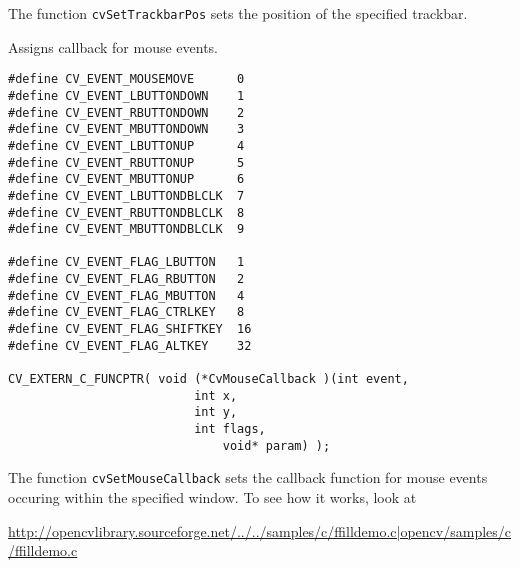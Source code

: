 The function \texttt{cvSetTrackbarPos} sets the position of the specified trackbar.


Assigns callback for mouse events.


\begin{lstlisting}
#define CV_EVENT_MOUSEMOVE      0
#define CV_EVENT_LBUTTONDOWN    1
#define CV_EVENT_RBUTTONDOWN    2
#define CV_EVENT_MBUTTONDOWN    3
#define CV_EVENT_LBUTTONUP      4
#define CV_EVENT_RBUTTONUP      5
#define CV_EVENT_MBUTTONUP      6
#define CV_EVENT_LBUTTONDBLCLK  7
#define CV_EVENT_RBUTTONDBLCLK  8
#define CV_EVENT_MBUTTONDBLCLK  9

#define CV_EVENT_FLAG_LBUTTON   1
#define CV_EVENT_FLAG_RBUTTON   2
#define CV_EVENT_FLAG_MBUTTON   4
#define CV_EVENT_FLAG_CTRLKEY   8
#define CV_EVENT_FLAG_SHIFTKEY  16
#define CV_EVENT_FLAG_ALTKEY    32

CV_EXTERN_C_FUNCPTR( void (*CvMouseCallback )(int event, 
					      int x, 
					      int y, 
					      int flags, 
				              void* param) );
\end{lstlisting}

\begin{description}
\end{description}

The function \texttt{cvSetMouseCallback} sets the callback function for mouse events occuring within the specified window. To see how it works, look at 

\url{http://opencvlibrary.sourceforge.net/../../samples/c/ffilldemo.c|opencv/samples/c/ffilldemo.c} 

